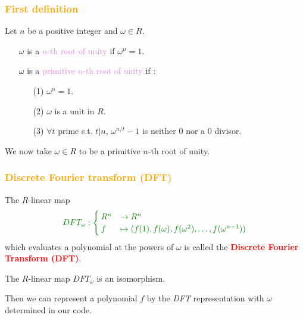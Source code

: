 \begin{frame}[fragile]
\frametitle{\textbf{\textcolor{orange}{First definition}}}

\begin{Definition}
Let $n$ be a positive integer and $\omega \in R$.
\begin{itemize}
\item[\textbullet] $\omega$ is a \textcolor{violet}{$n$-th root of unity} if $\omega^{n} = 1$.
\item[\textbullet] $\omega$ is a \textcolor{violet}{primitive $n$-th root of unity} if :
\begin{itemize}
\item[(1)] $\omega^{n} = 1$.
\item[(2)] $\omega$ is a unit in $R$.
\item[(3)] $\forall t$ prime s.t. $t|n$, $\omega^{n/t} - 1$ is neither $0$ nor a $0$ divisor.
\end{itemize}
\end{itemize}
\end{Definition}

We now take $\omega \in R$ to be a primitive $n$-th root of unity.

\end{frame}

\begin{frame}[fragile]
\frametitle{\textbf{\textcolor{orange}{Discrete Fourier transform (DFT)}}}

\begin{Definition}
The $R$-linear map
$$\textcolor{darkgreen}{DFT_{\omega} : \begin{cases}
R^n &\rightarrow R^n \\
f &\mapsto (f(1), f(\omega), f(\omega^{2}),\dots,f(\omega^{n-1}))
\end{cases}}$$
which evaluates a polynomial at the powers of $\omega$ is called the \textcolor{red}{\textbf{Discrete Fourier Transform (DFT)}}.
\end{Definition}

\begin{prop}
The $R$-linear map $DFT_{\omega}$ is an isomorphism.
\end{prop}

Then we can represent a polynomial $f$ by the \textit{DFT} representation with $\omega$ determined in our code.

\end{frame}

